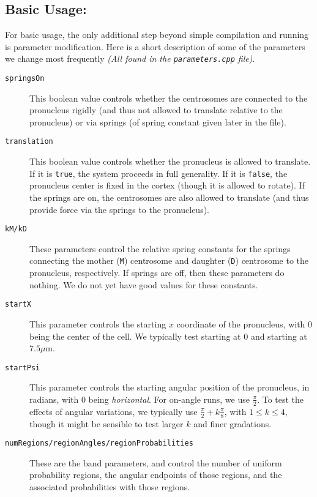 \documentclass{article}
\begin{document}
  \subsection{Basic Usage:}
  For basic usage, the only additional step beyond simple compilation and
  running is parameter modification. Here is a short description of some of the
  parameters we change most frequently \textit{(All found in the
  \texttt{parameters.cpp} file)}.
  \begin{description}
    \item[\texttt{springsOn} ] This boolean value controls whether the centrosomes
      are connected to the pronucleus rigidly (and thus not allowed to translate
      relative to the pronucleus) or via springs (of spring constant given later
      in the file).
    \item[\texttt{translation} ] This boolean value controls whether the
      pronucleus is allowed to translate. If it is \texttt{true}, the system
      proceeds in full generality. If it is \texttt{false}, the pronucleus
      center is fixed in the cortex (though it is allowed to rotate). If the
      springs are on, the centrosomes are also allowed to translate (and thus
      provide force via the springs to the pronucleus). 
    \item[\texttt{kM/kD} ] These parameters control the relative spring
      constants for the springs connecting the mother (\texttt{M}) centrosome and
      daughter (\texttt{D}) centrosome to the pronucleus, respectively. If
      springs are off, then these parameters do nothing. We do not yet have good
      values for these constants. 
    \item[\texttt{startX} ] This parameter controls the starting $x$ coordinate
      of the pronucleus, with $0$ being the center of the cell. We typically
      test starting at $0$ and starting at $7.5 \mu\text{m}$. 
    \item[\texttt{startPsi} ] This parameter controls the starting angular
      position of the pronucleus, in radians, with $0$ being \emph{horizontal}.
      For on-angle runs, we use $\frac{\pi}{2}$. To test the effects of angular
      variations, we typically use $\frac{\pi}{2} + k\frac{\pi}{8}$, with $1 \le
      k \le 4$, though it might be sensible to test larger $k$ and finer
      gradations. 
    \item[\texttt{numRegions/regionAngles/regionProbabilities} ] These are the
      band parameters, and control the number of uniform probability regions,
      the angular endpoints of those regions, and the associated probabilities
      with those regions. 
  \end{description}
\end{document}
